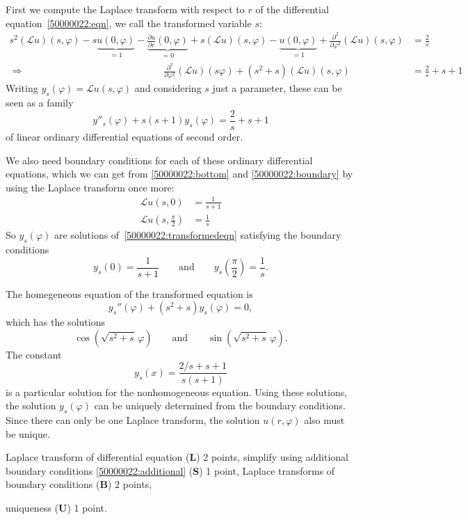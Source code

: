 \begin{loesung}
\begin{teilaufgaben}
\item
First we compute the Laplace transform with respect to $r$ of the
differential equation~\eqref{50000022:eqn}, we call the transformed variable
$s$:
\begin{align*}
s^2 (\mathscr{L}u)(s,\varphi)
   -s \underbrace{u(0,\varphi)}_{\textstyle=1}
   -\underbrace{\frac{\partial u}{\partial r}(0,\varphi)}_{\textstyle=0}
+s(\mathscr{L}u)(s,\varphi) - \underbrace{u(0,\varphi)}_{\textstyle=1}
+
\frac{\partial^2}{\partial\varphi^2}(\mathscr{L}u)(s,\varphi)
&=
\frac2s
\\
\Rightarrow\hspace{6cm}
\frac{\partial^2}{\partial\varphi^2}(\mathscr{L}u)(s\varphi)
+
(s^2+s) (\mathscr{L}u)(s,\varphi)
&=
\frac2s
+s+1
\end{align*}
Writing $y_s(\varphi)=\mathscr{L}u(s,\varphi)$ and considering
$s$ just a parameter, these can be seen as a family
\begin{equation}
y''_s(\varphi) +s(s+1) y_s(\varphi) = \frac{2}s+s+1
\label{50000022:transformedeqn}
\end{equation}
of linear ordinary
differential equations of second order.

We also need boundary conditions for each of these ordinary differential
equations, which we can get from \eqref{50000022:bottom} and
\eqref{50000022:boundary} by using the Laplace transform once more:
\begin{align*}
\mathscr{L}u(s,0) &= \frac{1}{s+1}
\\
\mathscr{L}u(s,{\textstyle\frac{\pi}2}) &= \frac1s
\end{align*}
So $y_s(\varphi)$ are solutions of~\eqref{50000022:transformedeqn}
satisfying the boundary conditions
\[
y_s(0)=\frac{1}{s+1}
\qquad\text{and}\qquad
y_s({\textstyle\frac{\pi}2})=\frac{1}s.
\]
\item
The homegeneous equation of the transformed equation is
\[
y_s''(\varphi) + (s^2+s) y_s(\varphi)=0,
\]
which has the solutions
\[
\cos(\!\sqrt{s^2+s}\,\varphi)
\qquad\text{and}\qquad
\sin(\!\sqrt{s^2+s}\,\varphi).
\]
The constant
\[
y_s(x) = \frac{2/s+s+1}{s(s+1)}
\]
is a particular solution for the nonhomogeneous equation.
Using these solutions, the solution $y_s(\varphi)$ can be uniquely determined
from the boundary conditions.
Since there can only be one Laplace transform, the solution $u(r,\varphi)$
also must be unique.
\qedhere
\end{teilaufgaben}
\end{loesung}

\begin{bewertung}
\begin{teilaufgaben}
\item
Laplace transform of differential equation ({\bf L}) 2 points,
simplify using additional boundary conditions \eqref{50000022:additional}
({\bf S}) 1 point,
Laplace transforms of boundary conditions ({\bf B}) 2 points,
\item
uniqueness ({\bf U}) 1 point.
\end{teilaufgaben}
\end{bewertung}

